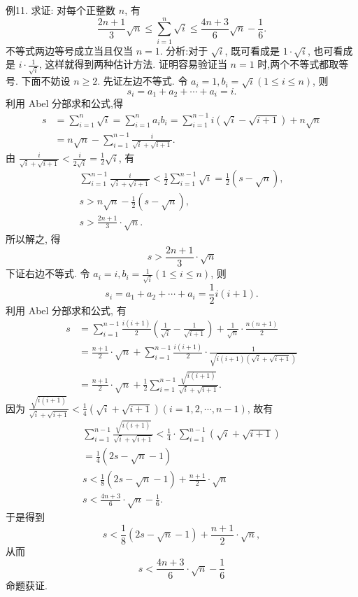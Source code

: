 例11. 求证: 对每个正整数 $n$, 有
$$
\frac{2 n+1}{3} \sqrt{n} \leqslant \sum_{i=1}^n \sqrt{i} \leqslant \frac{4 n+3}{6} \sqrt{n}-\frac{1}{6} .
$$
不等式两边等号成立当且仅当 $n=1$.
分析:对于 $\sqrt{i}$, 既可看成是 $1 \cdot \sqrt{i}$, 也可看成是 $i \cdot \frac{1}{\sqrt{i}}$, 这样就得到两种估计方法.
证明容易验证当 $n=1$ 时,两个不等式都取等号.
下面不妨设 $n \geqslant 2$.
先证左边不等式.
令 $a_i=1, b_i=\sqrt{i}(1 \leqslant i \leqslant n)$, 则
$$
s_i=a_1+a_2+\cdots+a_i=i .
$$
利用 Abel 分部求和公式,得
$$
\begin{aligned}
s & =\sum_{i=1}^n \sqrt{i}=\sum_{i=1}^n a_i b_i=\sum_{i=1}^{n-1} i(\sqrt{i}-\sqrt{i+1})+n \sqrt{n} \\
& =n \sqrt{n}-\sum_{i=1}^{n-1} \frac{i}{\sqrt{i}+\sqrt{i+1}} .
\end{aligned}
$$
由 $\frac{i}{\sqrt{i}+\sqrt{i+1}}<\frac{i}{2 \sqrt{i}}=\frac{1}{2} \sqrt{i}$, 有
$$
\begin{gathered}
\sum_{i=1}^{n-1} \frac{i}{\sqrt{i}+\sqrt{i+1}}<\frac{1}{2} \sum_{i=1}^{n-1} \sqrt{i}=\frac{1}{2}(s-\sqrt{n}), \\
s>n \sqrt{n}-\frac{1}{2}(s-\sqrt{n}), \\
s>\frac{2 n+1}{3} \cdot \sqrt{n} .
\end{gathered}
$$
所以解之, 得
$$
s>\frac{2 n+1}{3} \cdot \sqrt{n}
$$
下证右边不等式.
令 $a_i=i, b_i=\frac{1}{\sqrt{i}}(1 \leqslant i \leqslant n)$, 则
$$
s_i=a_1+a_2+\cdots+a_i=\frac{1}{2} i(i+1) .
$$
利用 Abel 分部求和公式, 有
$$
\begin{aligned}
s & =\sum_{i=1}^{n-1} \frac{i(i+1)}{2}\left(\frac{1}{\sqrt{i}}-\frac{1}{\sqrt{i+1}}\right)+\frac{1}{\sqrt{n}} \cdot \frac{n(n+1)}{2} \\
& =\frac{n+1}{2} \cdot \sqrt{n}+\sum_{i=1}^{n-1} \frac{i(i+1)}{2} \cdot \frac{1}{\sqrt{i(i+1)(\sqrt{i}+\sqrt{i+1})}} \\
& =\frac{n+1}{2} \cdot \sqrt{n}+\frac{1}{2} \sum_{i=1}^{n-1} \frac{\sqrt{i(i+1)}}{\sqrt{i}+\sqrt{i+1}} .
\end{aligned}
$$
因为 $\frac{\sqrt{i(i+1)}}{\sqrt{i}+\sqrt{i+1}}<\frac{1}{4}(\sqrt{i}+\sqrt{i+1})(i=1,2, \cdots, n-1)$,
故有
$$
\begin{gathered}
\sum_{i=1}^{n-1} \frac{\sqrt{i(i+1)}}{\sqrt{i}+\sqrt{i+1}}<\frac{1}{4} \cdot \sum_{i=1}^{n-1}(\sqrt{i}+\sqrt{i+1}) \\
=\frac{1}{4}(2 s-\sqrt{n}-1) \\
s<\frac{1}{8}(2 s-\sqrt{n}-1)+\frac{n+1}{2} \cdot \sqrt{n} \\
s<\frac{4 n+3}{6} \cdot \sqrt{n}-\frac{1}{6} .
\end{gathered}
$$
于是得到
$$
s<\frac{1}{8}(2 s-\sqrt{n}-1)+\frac{n+1}{2} \cdot \sqrt{n},
$$
从而
$$
s<\frac{4 n+3}{6} \cdot \sqrt{n}-\frac{1}{6}
$$
命题获证.



